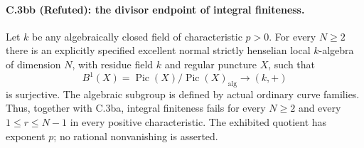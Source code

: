 \paragraph{C.3bb (Refuted): the divisor endpoint of integral finiteness.}
Let $k$ be any algebraically closed field of characteristic $p>0$.
For every $N\ge2$ there is an explicitly specified excellent normal
strictly henselian local $k$-algebra of dimension $N$, with residue
field $k$ and regular puncture $X$, such that
\[
 B^1(X)=\operatorname{Pic}(X)/
                  \operatorname{Pic}(X)_{\mathrm{alg}}
                          \longrightarrow(k,+)
\]
is surjective. The algebraic subgroup is defined by actual ordinary
curve families. Thus, together with C.3ba, integral finiteness fails
for every $N\ge2$ and every $1\le r\le N-1$ in every positive
characteristic. The exhibited quotient has exponent $p$; no rational
nonvanishing is asserted.

